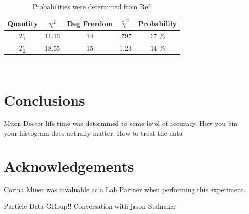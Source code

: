 \documentclass[11pt,letterpaper]{article}
\begin{document}
\begin{table}[!h]

	\begin{center}
		\begin{tabular}{|c|c|c|c|c|} \hline
			Quantity & $\chi^2$&Deg Freedom&$\tilde{\chi}^2$  &  Probability \\ \hline \hline
			$T_1$ & 11.16 & 14 & .797 &  67 \%   \\ \hline
			$T_2$ & 18.55 & 15 & 1.23 & 14 \%   \\ \hline
		\end{tabular} \\
		\caption{Probabilities were determined from Ref. \cite{TaylorError}}
        \label{table:ChiSq}
	\end{center}
\end{table}

\section{Conclusions}
Muon Dector life time was determined to some level of accuracy. How you bin your histogram does actually matter. How to treat the data
\section{Acknowledgements}
Corina Miner was invaluable as a Lab Partner when performing this experiment.

\begin{thebibliography}{99}
  Particle Data GRoup!!
 Conversation with jason Stalnaker



\end{thebibliography}
\end{document}
